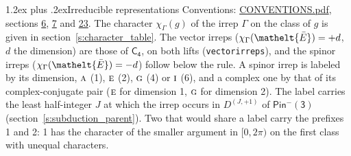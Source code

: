 \documentclass[10pt,a4paper]{article}
\makeatletter
\renewcommand\section{\@startsection{section}{1}{\z@}{-3ex plus -1ex minus -.2ex}%
  {1.2ex plus .2ex}{\normalfont\large\sffamily\bfseries\color{parttitle}}}
\numberwithin{equation}{section}
\newcommand{\eltfont}[1]{{\let\sigma\eltsigma\mathelt{#1}}}
\newcommand{\grp}[1]{\mathsf{#1}}
\newcommand{\irr}[1]{\text{\normalfont\scshape #1}}
\newcommand{\elt}[1]{\eltfont{#1}}
\newcommand{\irrJp}[2]{D^{(#1,#2)}}
\newcommand{\irchar}[1]{\chi_{#1}}
\newcommand{\barred}[1]{\bar{#1}}
\makeatother
\begin{document}
\section{Irreducible representations}\label{s:irreps}
Conventions: \href{../../CONVENTIONS.pdf}{CONVENTIONS.pdf}, sections \href{../../../rotation/CONVENTIONS.pdf\#conv.6}{6}, \href{../../../rotation/CONVENTIONS.pdf\#conv.7}{7} and \href{../../CONVENTIONS.pdf\#conv.23}{23}.
\leavevmode\label{n:function.character}\label{n:irrep.Gamma}The character $\irchar{\Gamma}(g)$ of the irrep $\Gamma$ on the class of $g$ is given in section~\ref{s:character_table}. \label{n:index.dimension}The vector irreps ($\irchar{\Gamma}(\elt{\barred{E}}) = +d$, $d$ the dimension) are those of \href{../../../rotation/data/pdf/C4.pdf}{$\grp{C_{4}}$}, on both lifts (\texttt{vectorirreps}), and the spinor irreps ($\irchar{\Gamma}(\elt{\barred{E}}) = -d$) follow below the rule. A spinor irrep is labeled by its dimension, $\irr{a}$ (1), $\irr{e}$ (2), $\irr{g}$ (4) or $\irr{i}$ (6), and a complex one by that of its complex-conjugate pair ($\irr{e}$ for dimension 1, $\irr{g}$ for dimension 2). The label carries the least half-integer $J$ at which the irrep occurs in $\irrJp{J}{+1}$ of $\grp{Pin^{-}(3)}$ (section~\ref{s:subduction_parent}). Two that would share a label carry the prefixes 1 and 2: 1 has the character of the smaller argument in $[0, 2\pi)$ on the first class with unequal characters.
\end{document}

